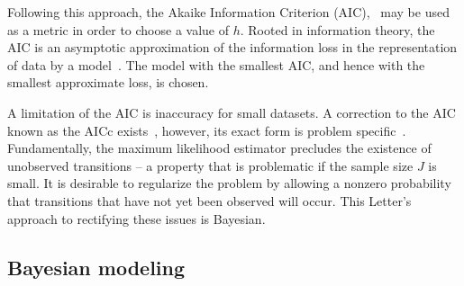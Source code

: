 \documentclass{IOS-Book-Article}
\newcommand{\bN}{\mathbf{N}}
\begin{document}
Following this approach, the Akaike Information Criterion (AIC),~\cite{akaike1974new,tong1975determination,katz1981some}  %
 may be used as a metric in order to choose a value of $h$.  Rooted in information theory, the AIC is an asymptotic approximation of the information loss in the representation of data by a model~\cite{burnham2003model}. The model with the smallest AIC, and hence with the smallest approximate loss, is chosen.

A limitation of the AIC is inaccuracy for small datasets. A correction to the AIC known as the AICc exists~\cite{hurvich1989regression}, however, its exact form is problem specific~\cite{burnham2003model}. Fundamentally, the maximum likelihood estimator precludes the existence of unobserved transitions -- a property that is problematic if  the sample size $J$ is small.
It is desirable to regularize the problem by allowing a nonzero probability that
transitions that have not yet been observed will occur. This Letter's approach to rectifying these issues is Bayesian.


\subsection{Bayesian modeling}
\end{document}

